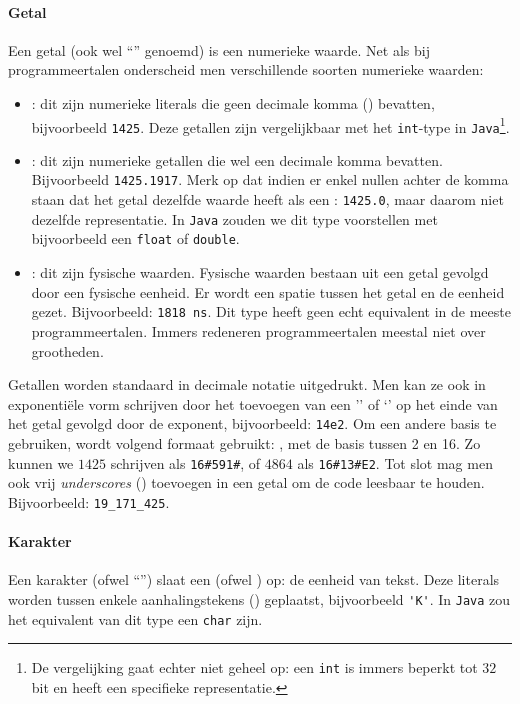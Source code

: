 \paragraph{Getal}Een getal (ook wel ``'' genoemd) is een numerieke waarde. Net als bij programmeertalen onderscheid men verschillende soorten numerieke waarden:
\begin{itemize}
  \item {}: dit zijn numerieke literals die geen decimale komma () bevatten, bijvoorbeeld \verb+1425+. Deze getallen zijn vergelijkbaar met het \texttt{int}-type in \texttt{Java}\footnote{De vergelijking gaat echter niet geheel op: een \texttt{int} is immers beperkt tot $32$ bit en heeft een specifieke representatie.}.
  \item {}: dit zijn numerieke getallen die wel een decimale komma bevatten. Bijvoorbeeld \verb+1425.1917+. Merk op dat indien er enkel nullen achter de komma staan dat het getal dezelfde waarde heeft als een : \verb+1425.0+, maar daarom niet dezelfde representatie. In \texttt{Java} zouden we dit type voorstellen met bijvoorbeeld een \texttt{float} of \texttt{double}.
  \item {}: dit zijn fysische waarden. Fysische waarden bestaan uit een getal gevolgd door een fysische eenheid. Er wordt een spatie tussen het getal en de eenheid gezet. Bijvoorbeeld: \verb+1818 ns+. Dit type heeft geen echt equivalent in de meeste programmeertalen. Immers redeneren programmeertalen meestal niet over grootheden.
\end{itemize}
Getallen worden standaard in decimale notatie uitgedrukt. Men kan ze ook in exponenti\"ele vorm schrijven door het toevoegen van een '' of `' op het einde van het getal gevolgd door de exponent, bijvoorbeeld: \verb+14e2+. Om een andere basis te gebruiken, wordt volgend formaat gebruikt: , met de basis tussen 2 en 16. Zo kunnen we $1425$ schrijven als \verb+16#591#+, of $4864$ als \verb+16#13#E2+. Tot slot mag men ook vrij \emph{underscores} (\vhdltermen{\_}) toevoegen in een getal om de code leesbaar te houden. Bijvoorbeeld: \verb+19_171_425+.


\paragraph{Karakter} Een karakter (ofwel ``'') slaat een  (ofwel ) op: de eenheid van tekst. Deze literals worden tussen enkele aanhalingstekens () geplaatst, bijvoorbeeld \verb+'K'+. In \texttt{Java} zou het equivalent van dit type een \texttt{char} zijn.

